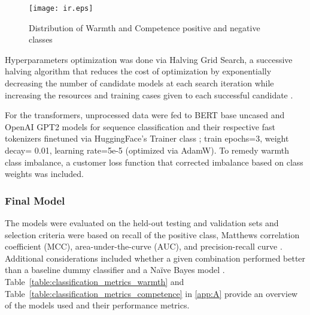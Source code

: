 \documentclass[man]{apa7}
\begin{document}
\begin{figure}
    \caption{Distribution of Warmth and Competence positive and negative classes}
    \label{fig:ir}
    \texttt{[image: ir.eps]}
\end{figure}

Hyperparameters optimization was done via Halving Grid Search, a successive halving algorithm that reduces the cost of optimization by exponentially decreasing the number of candidate models at each search iteration while increasing the resources and training cases given to each successful candidate \parencite{soper_hyperparameter_2023}.

For the transformers, unprocessed data were fed to BERT base uncased \parencite{devlin_bert_2018} and OpenAI GPT2 \parencite{radford2019language} models for sequence classification and their respective fast tokenizers finetuned via HuggingFace’s Trainer class \parencite{wolf_transformers_2020}; train epochs=3, weight decay= 0.01, learning rate=5e-5 (optimized via AdamW). To remedy warmth class imbalance, a customer loss function that corrected imbalance based on class weights was included.

\subsubsection{Final Model}
\label{final_model}
The models were evaluated on the held-out testing and validation sets and selection criteria were based on recall of the positive class, Matthews correlation coefficient (MCC), area-under-the-curve (AUC), and precision-recall curve \parencite{burscher_teaching_2014, chicco_advantages_2020, lever_classification_2016, seliya_study_2009}. Additional considerations included whether a given combination performed better than a baseline dummy classifier and a Naïve Bayes model \parencite{choudhary_comprehensive_2017}. Table~\ref{table:classification_metrics_warmth} and Table~\ref{table:classification_metrics_competence} in \ref{app:A} provide an overview of the models used and their performance metrics.
\end{document}
